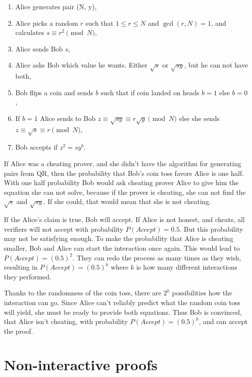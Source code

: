 \begin{enumerate}
    \item Alice generates pair (N, y),
    \item Alice picks a random $r$ such that $1 \leq r \leq N$ and $\gcd(r, N) = 1$,
          and calculates $s \equiv r^2 \pmod{N}$,
    \item Alice sends Bob $s$,
    \item Alice asks Bob which value he wants. Either $\sqrt{s}$ or $\sqrt{sy}$, but he can not have both,
    \item Bob flips a coin and sends $b$ such that if coin landed on heads $b = 1$ else $b = 0$,
    \item If $b = 1$ Alice sends to Bob $z \equiv \sqrt{sy} \equiv r \sqrt{y} \pmod{N}$ else she sends $z \equiv \sqrt{s} \equiv r \pmod{N}$,
    \item Bob accepts if $z^2 = sy^b$.
\end{enumerate}

If Alice was a cheating prover, and she didn't have the algorithm for
generating pairs from QR, then the probability that Bob's coin toss favors
Alice is one half. With one half probability Bob would ask cheating prover
Alice to give him the equation she can not solve, because if the prover is
cheating, she can not find the $\sqrt{s}$ and $\sqrt{sy}$. If she could,
that would mean that she is not cheating.

If the Alice's claim is true, Bob will accept. If Alice is not honest, and
cheats, all verifiers will not accept with probability $P(Accept) = 0.5$.
But this probability may not be satisfying enough. To make the probability
that Alice is cheating smaller, Bob and Alice can start the interaction once
again. This would lead to $P(Accept) = (0.5)^2$. They can redo the process
as many times as they wish, resulting in $P(Accept) = (0.5)^k$ where $k$
is how many different interactions they performed.

Thanks to the randomness of the coin toss, there are $2^k$ possibilities how
the interaction can go. Since Alice can't reliably predict what the random
coin toss will yield, she must be ready to provide both equations. Thus Bob is
convinced, that Alice isn't cheating, with probability $P(Accept) = (0.5)^k$,
and can accept the proof.

\section{Non-interactive proofs}

